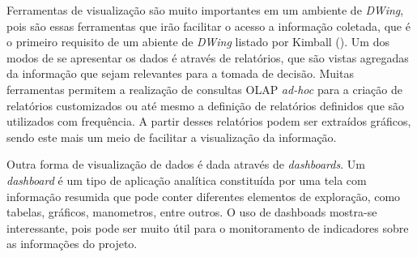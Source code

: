 Ferramentas de visualização são muito importantes em um ambiente de \emph{DWing}, pois são essas ferramentas que irão facilitar o acesso a informação coletada, que é o primeiro requisito de um abiente de \emph{DWing} listado por Kimball (\citeyear{kimball2002}). Um dos modos de se apresentar os dados é através de relatórios, que são vistas agregadas da informação que sejam relevantes para a tomada de decisão. Muitas ferramentas permitem a realização de consultas OLAP \emph{ad-hoc} para a criação de relatórios customizados ou até mesmo a definição de relatórios definidos que são utilizados com frequência. A partir desses relatórios podem ser extraídos gráficos, sendo este mais um meio de facilitar a visualização da informação. 

Outra forma de visualização de dados é dada através  de \emph{dashboards}. Um \emph{dashboard} é um tipo de aplicação analítica constituída por uma tela com informação resumida que pode conter diferentes elementos de exploração, como tabelas, gráficos, manometros, entre outros. O uso de dashboads mostra-se interessante, pois pode ser muito útil para o monitoramento de indicadores sobre as informações do projeto. 

